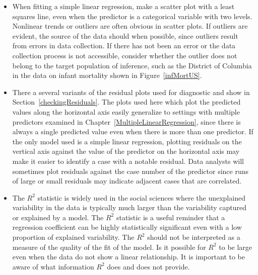 \begin{itemize}

\item When fitting a simple linear regression, make a scatter plot with a least squares line, even when the predictor is a categorical variable with two levels.  Nonlinear trends or outliers are often obvious in scatter plots.  If outliers are evident, the source of the data should when possible, since outliers result from errors in data collection.  If there has not been an error or the data collection process is not accessible, consider whether the outlier does not belong to the target population of inference, such as the District of Columbia in the data on infant mortality shown in Figure~\ref{infMortUS}.
 
   \item  There a several variants of the residual plots used for diagnostic and show in Section~\ref{checkingResiduals}.  The plots used here which plot the predicted values along the horizontal axis easily generalize to settings with multiple predictors examined in Chapter~\ref{MultipleLinearRegression}, since there is always a single predicted value even when there is more than one predictor.  If the only model used is a simple linear regression, plotting residuals on the vertical axis against the value of the predictor on the horizontal axis may make it easier to identify a case with a notable residual.  Data analysts will sometimes plot residuals against the case number of the predictor since runs of large or small residuals may indicate adjacent cases that are correlated.

   \item  The $R^2$ statistic is widely used in the social sciences where the unexplained variability in the data is typically much larger than the variability captured or explained by a model.  The $R^2$ statistic is a useful reminder that a regression coefficient can be highly statistically significant even with a low proportion of explained variability.  The $R^2$ should not be interpreted as a measure of the quality of the fit of the model.  Is it possible for $R^2$ to be large even when the data do not show a linear relationship. It is important to be aware of what information $R^2$ does and does not provide.


\end{itemize}
